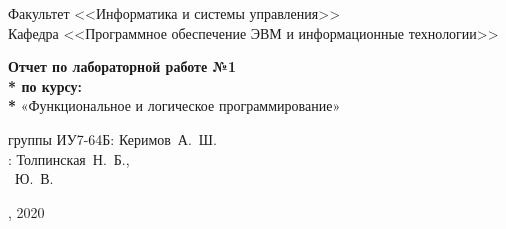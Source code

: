 \begin{titlepage}
\vspace{2em}

\hrulefill

\begin{center}
 	\vspace{0pt plus2fill} %
	{\large
	Факультет  <<Информатика и системы управления>>\\
	Кафедра  <<Программное обеспечение ЭВМ и информационные технологии>>
	}
\end{center}

{\Large
\begin{center}
	\textbf{Отчет по лабораторной работе №1 \\* по курсу: \\* } «Функциональное и логическое программирование» \\
\end{center}
}
%
\vspace{0pt plus4fill} %

\begin{center}
\newlength{\ML}
 группы ИУ7-64Б:\hspace{0.2cm} Керимов~А.~Ш.\\
:\hspace{0.2cm} Толпинская~Н.~Б.,\\
~Ю.~В.

\end{center}
%

\vspace{0pt plus4fill} %
{, 2020\par}
\end{titlepage}
